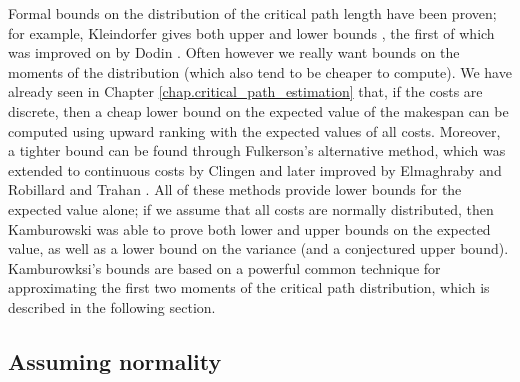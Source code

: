 \documentclass[12pt]{article}
\begin{document}
Formal bounds on the distribution of the critical path length have been proven; for example, Kleindorfer gives both upper and lower bounds \cite{kle71}, the first of which was improved on by Dodin \cite{dod85}. Often however we really want bounds on the moments of the distribution (which also tend to be cheaper to compute). We have already seen in Chapter \ref{chap.critical_path_estimation} that, if the costs are discrete, then a cheap lower bound on the expected value of the makespan can be computed using upward ranking with the expected values of all costs. Moreover, a tighter bound can be found through Fulkerson's \cite{ful62} alternative method, which was extended to continuous costs by Clingen \cite{cli64} and later improved by Elmaghraby \cite{elm67} and Robillard and Trahan \cite{rob76}. All of these methods provide lower bounds for the expected value alone; if we assume that all costs are normally distributed, then Kamburowski \cite{kam85} was able to prove both lower and upper bounds on the expected value, as well as a lower bound on the variance (and a conjectured upper bound). Kamburowksi's bounds are based on a powerful common technique for approximating the first two moments of the critical path distribution, which is described in the following section.

\subsection{Assuming normality}
\label{subsect.normality}
\end{document}
